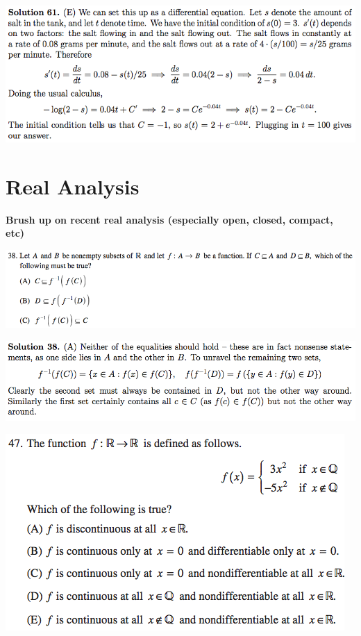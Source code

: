 \documentclass{article}
\begin{document}
\includegraphics[scale=0.65]{1268_61s}

\pagebreak

\section{Real Analysis}

\textbf{Brush up on recent real analysis (especially open, closed, compact, etc)}

%

\includegraphics[scale=0.5]{0568_38}

\includegraphics[scale=0.5]{0568_38s}

\includegraphics[scale=0.65]{1268_47}
\end{document}
